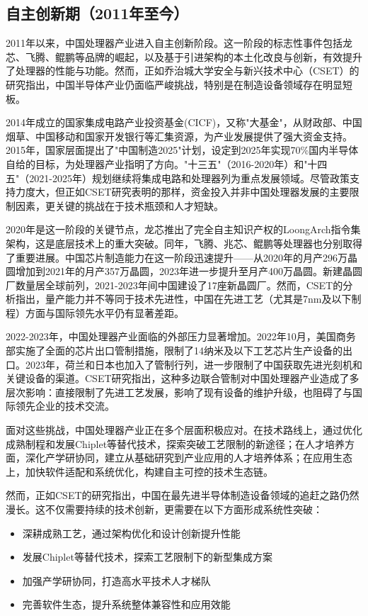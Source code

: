 \documentclass[a4paper,colorlinks=true,linkcolor=blue,urlcolor=blue,citecolor=green,bookmarks=true]{article}
\begin{document}
\subsection{自主创新期（2011年至今）}

2011年以来，中国处理器产业进入自主创新阶段。这一阶段的标志性事件包括龙芯、飞腾、鲲鹏等品牌的崛起，以及基于引进架构的本土化改良与创新，有效提升了处理器的性能与功能。然而，正如乔治城大学安全与新兴技术中心（CSET）的研究指出，中国半导体产业仍面临严峻挑战，特别是在制造设备领域存在明显短板\cite{4}。

2014年成立的国家集成电路产业投资基金(CICF)，又称"大基金"，从财政部、中国烟草、中国移动和国家开发银行等汇集资源，为产业发展提供了强大资金支持。2015年，国家层面提出了"中国制造2025"计划，设定到2025年实现70\%国内半导体自给的目标，为处理器产业指明了方向。"十三五"（2016-2020年）和"十四五"（2021-2025年）规划继续将集成电路和处理器列为重点发展领域\cite{17}\cite{8}\cite{3}。尽管政策支持力度大，但正如CSET研究表明的那样，资金投入并非中国处理器发展的主要限制因素，更关键的挑战在于技术瓶颈和人才短缺\cite{4}。

2020年是这一阶段的关键节点，龙芯推出了完全自主知识产权的LoongArch指令集架构，这是底层技术上的重大突破。同年，飞腾、兆芯、鲲鹏等处理器也分别取得了重要进展。中国芯片制造能力在这一阶段迅速提升——从2020年的月产296万晶圆增加到2021年的月产357万晶圆，2023年进一步提升至月产400万晶圆。新建晶圆厂数量居全球前列，2021-2023年间中国建设了17座新晶圆厂\cite{9}\cite{17}\cite{11}\cite{3}。然而，CSET的分析指出，量产能力并不等同于技术先进性，中国在先进工艺（尤其是7nm及以下制程）方面与国际领先水平仍有显著差距\cite{4}。

2022-2023年，中国处理器产业面临的外部压力显著增加。2022年10月，美国商务部实施了全面的芯片出口管制措施，限制了14纳米及以下工艺芯片生产设备的出口。2023年，荷兰和日本也加入了管制行列，进一步限制了中国获取先进光刻机和关键设备的渠道。CSET研究指出，这种多边联合管制对中国处理器产业造成了多层次影响：直接限制了先进工艺发展，影响了现有设备的维护升级，也阻碍了与国际领先企业的技术交流\cite{4}。

面对这些挑战，中国处理器产业正在多个层面积极应对。在技术路线上，通过优化成熟制程和发展Chiplet等替代技术，探索突破工艺限制的新途径；在人才培养方面，深化产学研协同，建立从基础研究到产业应用的人才培养体系；在应用生态上，加快软件适配和系统优化，构建自主可控的技术生态链。

然而，正如CSET的研究指出，中国在最先进半导体制造设备领域的追赶之路仍然漫长。这不仅需要持续的技术创新，更需要在以下方面形成系统性突破：

\begin{itemize}
\item 深耕成熟工艺，通过架构优化和设计创新提升性能
\item 发展Chiplet等替代技术，探索工艺限制下的新型集成方案
\item 加强产学研协同，打造高水平技术人才梯队
\item 完善软件生态，提升系统整体兼容性和应用效能
\end{itemize}
\end{document}
